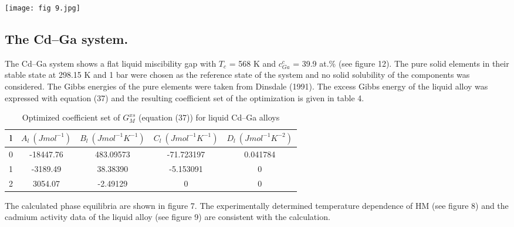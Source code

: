 \documentclass[12pt]{article}
\newcommand*{\1}{\hspace{1pt}}
\begin{document}
    \begin{adjustbox}{center,caption={Calculated phase diagram (continuous curve) using the 
        coefficient set given in table 3.},label={somelabel},nofloat=figure,vspace=\bigskipamount}
        \texttt{[image: fig 9.jpg]}
    \end{adjustbox}


    \subsection{ The Cd–Ga system.}

    The Cd–Ga system shows a flat liquid miscibility gap with $T _c$ = 568 K and $c^{c}_{Ga}$ = 39.9 at.\% (see figure 12). 
    The pure solid elements in their stable state at 298.15 K and 1 bar were chosen as
    the reference state of the system and no solid solubility of the components was considered. The
    Gibbs energies of the pure elements were taken from Dinsdale (1991). The excess Gibbs
    energy of the liquid alloy was expressed with equation (37) and the resulting coefficient
    set of the optimization is given in table 4. 
    \begin{table}[t!]
        \centering
        \caption{Optimized coefficient set of $G ^ {xs} _ {M}$ 
        (equation (37)) for liquid Cd–Ga alloys}
        \begin{tabular}{|c | c | c | c | c |} 
        \hline
        l & $A_l \ (J mol^{-1})$ & $B_l \ (J mol^{-1}K^{-1})$ & $C_l \ (J mol^{-1}K^{-1})$ & $D_l \ (J mol^{-1}K^{-2})$\\ [0.5ex] 
        \hline\hline
        0 & -18447.76 & 483.09573 & -71.723197 & 0.041784  \\ 
        1 & -3189.49 & 38.38390 & -5.153091 & 0 \\
        2 & 3054.07 & -2.49129 & 0 & 0  \\ [1ex] 
        \hline
        \end{tabular}
        \end{table}

    The calculated phase equilibria are shown in
    figure 7. The experimentally determined temperature dependence of HM (see figure 8)
    and the cadmium activity data of the liquid alloy (see figure 9) are consistent with the calculation.
\end{document}
